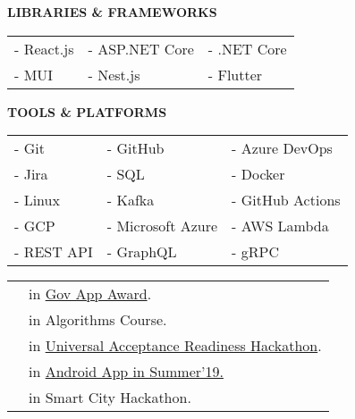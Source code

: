 \documentclass[10pt,a4paper,ragged2e]{altacv}
\begin{document}
\smallskip
\divider

\textcolor{VividPurple}{\textbf{LIBRARIES \& FRAMEWORKS}}
\smallskip

\begin{tabular}{ l l l } 
	- React.js & - ASP.NET Core & - .NET Core \\
	- MUI      & - Nest.js      & - Flutter   \\ 
\end{tabular}

\smallskip
\divider

\textcolor{VividPurple}{\textbf{TOOLS \& PLATFORMS}}
\smallskip

\begin{tabular}{ l l l }
	- Git      & - GitHub          & - Azure DevOps   \\
	- Jira     & - SQL             & - Docker         \\ 
	- Linux    & - Kafka           & - GitHub Actions \\
	- GCP      & - Microsoft Azure & - AWS Lambda     \\
	- REST API & - GraphQL         & - gRPC           \\
\end{tabular}
\smallskip

\smallskip

\begin{tabular}{ l l }
	\faTrophy &  in \href{https://www.linkedin.com/feed/update/urn:li:activity:6711649526421295104/}{Gov App Award}.         \\
	\faTrophy &  in Algorithms Course.              \\ 
	\faTrophy &  in \href{https://www.linkedin.com/feed/update/urn:li:activity:6572611476543025152/}{Universal Acceptance Readiness Hackathon}.  \\
	\faTrophy &  in \href{https://www.facebook.com/permalink.php?story_fbid=2077703849203331 & id=1839142163059502}{Android App in Summer’19.} \\
	\faTrophy &  in Smart City Hackathon.               \\
\end{tabular}

\clearpage


\nocite{*}






\end{document}
